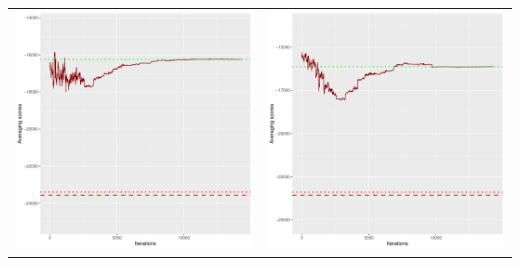 \documentclass[]{scrartcl}
\begin{document}
\begin{table}[h!]
\begin{tabular}{cc}
\includegraphics[scale = 0.4]{./figs/win95pts/v4/25/avgBoundsEvolution-14252.pdf} & 
\includegraphics[scale = 0.4]{./figs/win95pts/v4/50/avgBoundsEvolution-14252.pdf} \\

\end{tabular}
\end{table}
\end{document}
